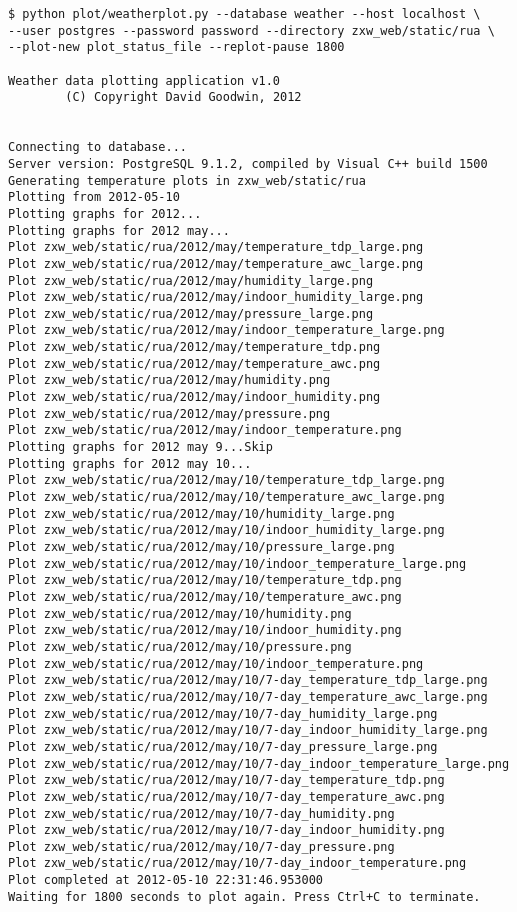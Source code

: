\documentclass[a4paper,10pt,draft]{book}
\begin{document}
\begin{verbatim}
$ python plot/weatherplot.py --database weather --host localhost \
--user postgres --password password --directory zxw_web/static/rua \
--plot-new plot_status_file --replot-pause 1800

Weather data plotting application v1.0
        (C) Copyright David Goodwin, 2012


Connecting to database...
Server version: PostgreSQL 9.1.2, compiled by Visual C++ build 1500
Generating temperature plots in zxw_web/static/rua
Plotting from 2012-05-10
Plotting graphs for 2012...
Plotting graphs for 2012 may...
Plot zxw_web/static/rua/2012/may/temperature_tdp_large.png
Plot zxw_web/static/rua/2012/may/temperature_awc_large.png
Plot zxw_web/static/rua/2012/may/humidity_large.png
Plot zxw_web/static/rua/2012/may/indoor_humidity_large.png
Plot zxw_web/static/rua/2012/may/pressure_large.png
Plot zxw_web/static/rua/2012/may/indoor_temperature_large.png
Plot zxw_web/static/rua/2012/may/temperature_tdp.png
Plot zxw_web/static/rua/2012/may/temperature_awc.png
Plot zxw_web/static/rua/2012/may/humidity.png
Plot zxw_web/static/rua/2012/may/indoor_humidity.png
Plot zxw_web/static/rua/2012/may/pressure.png
Plot zxw_web/static/rua/2012/may/indoor_temperature.png
Plotting graphs for 2012 may 9...Skip
Plotting graphs for 2012 may 10...
Plot zxw_web/static/rua/2012/may/10/temperature_tdp_large.png
Plot zxw_web/static/rua/2012/may/10/temperature_awc_large.png
Plot zxw_web/static/rua/2012/may/10/humidity_large.png
Plot zxw_web/static/rua/2012/may/10/indoor_humidity_large.png
Plot zxw_web/static/rua/2012/may/10/pressure_large.png
Plot zxw_web/static/rua/2012/may/10/indoor_temperature_large.png
Plot zxw_web/static/rua/2012/may/10/temperature_tdp.png
Plot zxw_web/static/rua/2012/may/10/temperature_awc.png
Plot zxw_web/static/rua/2012/may/10/humidity.png
Plot zxw_web/static/rua/2012/may/10/indoor_humidity.png
Plot zxw_web/static/rua/2012/may/10/pressure.png
Plot zxw_web/static/rua/2012/may/10/indoor_temperature.png
Plot zxw_web/static/rua/2012/may/10/7-day_temperature_tdp_large.png
Plot zxw_web/static/rua/2012/may/10/7-day_temperature_awc_large.png
Plot zxw_web/static/rua/2012/may/10/7-day_humidity_large.png
Plot zxw_web/static/rua/2012/may/10/7-day_indoor_humidity_large.png
Plot zxw_web/static/rua/2012/may/10/7-day_pressure_large.png
Plot zxw_web/static/rua/2012/may/10/7-day_indoor_temperature_large.png
Plot zxw_web/static/rua/2012/may/10/7-day_temperature_tdp.png
Plot zxw_web/static/rua/2012/may/10/7-day_temperature_awc.png
Plot zxw_web/static/rua/2012/may/10/7-day_humidity.png
Plot zxw_web/static/rua/2012/may/10/7-day_indoor_humidity.png
Plot zxw_web/static/rua/2012/may/10/7-day_pressure.png
Plot zxw_web/static/rua/2012/may/10/7-day_indoor_temperature.png
Plot completed at 2012-05-10 22:31:46.953000
Waiting for 1800 seconds to plot again. Press Ctrl+C to terminate.
\end{verbatim}
\end{document}
